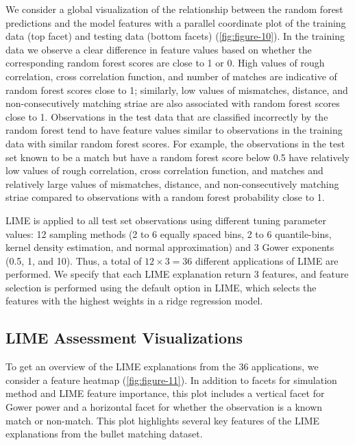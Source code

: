 \documentclass[AMS,STIX2COL]{WileyNJD-v2}\usepackage[]{graphicx}\usepackage[]{color}
\begin{document}
We consider a global visualization of the relationship between the random forest predictions and the model features with a parallel coordinate plot of the training data (top facet) and testing data (bottom facets)  (\autoref{fig:figure-10}). In the training data we observe a clear difference in feature values based on whether the corresponding random forest scores are close to 1 or 0. High values of rough correlation, cross correlation function, and number of matches are indicative of random forest scores close to 1; similarly, low values of mismatches, distance, and non-consecutively matching striae are also associated with random forest scores close to 1. Observations in the test data that are classified incorrectly by the random forest tend to have feature values similar to observations in the training data with similar random forest scores. For example, the observations in the test set known to be a match but have a random forest score below 0.5 have relatively low values of rough correlation, cross correlation function, and matches and relatively large values of mismatches, distance, and non-consecutively matching striae compared to observations with a random forest probability close to 1.

LIME is applied to all test set observations using different tuning parameter values: 12 sampling methods (2 to 6 equally spaced bins, 2 to 6 quantile-bins, kernel density estimation, and normal approximation) and 3 Gower exponents (0.5, 1, and 10). Thus, a total of $12\times 3=36$ different applications of LIME are performed. We specify that each LIME explanation return 3 features, and feature selection is performed using the default option in LIME, which selects the features with the highest weights in a ridge regression model.







\subsection{LIME Assessment Visualizations} \label{bullet-assess-ex}

To get an overview of the LIME explanations from the 36 applications, we consider a feature heatmap (\autoref{fig:figure-11}). In addition to facets for simulation method and LIME feature importance, this plot includes a vertical facet for Gower power and a horizontal facet for whether the observation is a known match or non-match. This plot highlights several key features of the LIME explanations from the bullet matching dataset.
\end{document}
